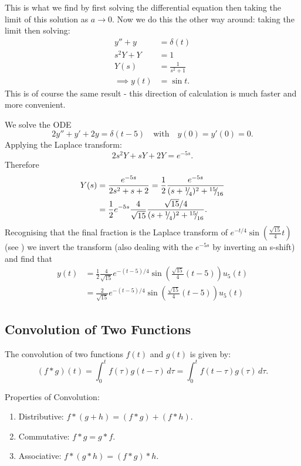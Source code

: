 This is what we find by first solving the differential equation then taking the limit of this solution as $a \to 0$. Now we do this the other way around: taking the limit then solving:
\begin{align*}
	y'' + y &= \delta(t) \\
	s^2Y + Y &= 1 \\
	Y(s) &= \frac{1}{s^2+1} \\
	\implies y(t) &= \sin{t}.
\end{align*}
This is of course the same result - this direction of calculation is much faster and more convenient.

\begin{eg}
	We solve the ODE
	\[
	2y''+y'+2y=\delta(t-5) \quad\text{with}\quad y(0)=y'(0)=0.
	\]
	Applying the Laplace transform:
	\[
	2s^2Y + sY + 2Y = e^{-5s}.
	\]
	Therefore
	\begin{align*}
		Y(s) &= \frac{e^{-5s}}{2s^2+s+2} = \frac12 \frac{e^{-5s}}{(s+{}^{1}{\mskip -5mu/\mskip -3mu}_{4})^2+{}^{15}{\mskip -5mu/\mskip -3mu}_{16}} \\
		&= \frac12 e^{-5s} \frac{4}{\sqrt{15}} \frac{\sqrt{15}/4}{(s+{}^{1}{\mskip -5mu/\mskip -3mu}_{4})^2+{}^{15}{\mskip -5mu/\mskip -3mu}_{16}}.
	\end{align*}
	Recognising that the final fraction is the Laplace transform of $e^{-t/4}\sin\left(\frac{\sqrt{15}}{4}t\right)$ (see ) we invert the transform (also dealing with the $e^{-5s}$ by inverting an s-shift) and find that
	\begin{align*}
		y(t) &= \frac12 \frac{4}{\sqrt{15}} e^{-(t-5)/4} \sin\left(\frac{\sqrt{15}}{4}(t-5)\right) u_5(t) \\
		&= \frac{2}{\sqrt{15}} e^{-(t-5)/4} \sin\left(\frac{\sqrt{15}}{4}(t-5)\right) u_5(t)
	\end{align*}
\end{eg}


\subsection{Convolution of Two Functions}

The convolution of two functions $f(t)$ and $g(t)$ is given by:
\begin{equation}
	(f * g)(t) = \int_0^t f(\tau)g(t - \tau) \,d\tau = \int_0^t f(t - \tau)g(\tau) \,d\tau.
\end{equation}

Properties of Convolution:
\begin{enumerate}
	\item Distributive: $f*(g+h) = (f*g)+(f*h)$.
	\item Commutative: $f*g = g*f$.
	\item Associative: $f*(g*h) = (f*g)*h$.
\end{enumerate}

